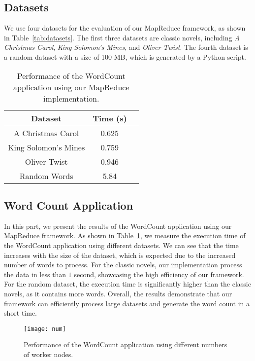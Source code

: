 \subsection{Datasets}
\label{subsec:datasets}

We use four datasets for the evaluation of our MapReduce framework, as shown in Table~\ref{tab:datasets}. The first three datasets are classic novels, including \textit{A Christmas Carol}, \textit{King Solomon's Mines}, and \textit{Oliver Twist}. The fourth dataset is a random dataset with a size of 100 MB, which is generated by a Python script.

\begin{table}[!t]
    \centering
    \caption{Performance of the WordCount application using our MapReduce implementation.}
    \label{tab:wordcount}
    \begin{tabular}{|c|c|c|}
        \hline
        \textbf{Dataset} & \textbf{Time (s)} \\
        \hline
        A Christmas Carol & 0.625 \\
        King Solomon's Mines & 0.759 \\
        Oliver Twist & 0.946 \\
        Random Words & 5.84 \\
        \hline
    \end{tabular}
\end{table}

\subsection{Word Count Application}
\label{subsec:word}

In this part, we present the results of the WordCount application using our MapReduce framework. As shown in Table~\ref{tab:wordcount}, we measure the execution time of the WordCount application using different datasets. We can see that the time increases with the size of the dataset, which is expected due to the increased number of words to process. For the classic novels, our implementation process the data in less than $1$ second, showcasing the high efficiency of our framework. For the random dataset, the execution time is significantly higher than the classic novels, as it contains more words. Overall, the results demonstrate that our framework can efficiently process large datasets and generate the word count in a short time.

\begin{figure}
    \centering
    \texttt{[image: num]}
    \caption{Performance of the WordCount application using different numbers of worker nodes.}
    \label{fig:wordcount}
\end{figure}

